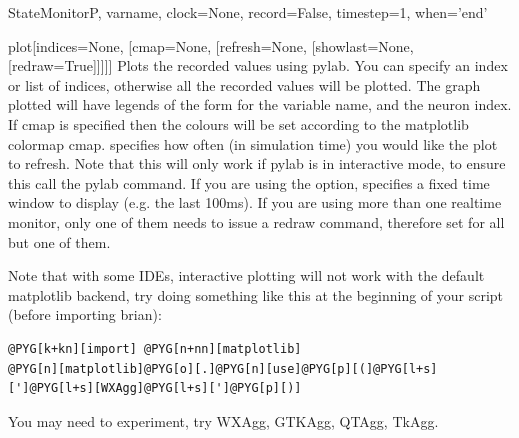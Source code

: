 \documentclass[letterpaper,10pt,english]{manual}
\begin{document}
\begin{classdesc}{StateMonitor}{P, varname, clock=None, record=False, timestep=1, when='end'}
\hypertarget{brian.StateMonitor.plot}{}\begin{methoddesc}{plot}{{[}indices=None, {[}cmap=None, {[}refresh=None, {[}showlast=None, {[}redraw=True{]}{]}{]}{]}{]}}
Plots the recorded values using pylab. You can specify an index or
list of indices, otherwise all the recorded values will be plotted.
The graph plotted will have legends of the form  for
 the variable name, and  the neuron index. If cmap is
specified then the colours will be set according to the matplotlib
colormap cmap.  specifies how often (in simulation time)
you would like the plot to refresh. Note that this will only work if
pylab is in interactive mode, to ensure this call the pylab 
command. If you are using the  option,  specifies
a fixed time window to display (e.g. the last 100ms).
If you are using more than one realtime monitor, only one of them needs
to issue a redraw command, therefore set  for all but
one of them.

Note that with some IDEs, interactive plotting will not work with the
default matplotlib backend, try doing something like this at the
beginning of your script (before importing brian):

\begin{Verbatim}[commandchars=@\[\]]
@PYG[k+kn][import] @PYG[n+nn][matplotlib]
@PYG[n][matplotlib]@PYG[o][.]@PYG[n][use]@PYG[p][(]@PYG[l+s][']@PYG[l+s][WXAgg]@PYG[l+s][']@PYG[p][)]
\end{Verbatim}

You may need to experiment, try WXAgg, GTKAgg, QTAgg, TkAgg.
\end{methoddesc}
\end{classdesc}
\end{document}
